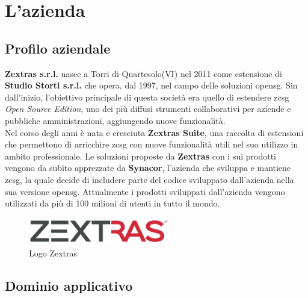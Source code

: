 
\chapter{L'azienda}
\label{cap:azienda}

\section{Profilo aziendale}
    \textbf{Zextras s.r.l.} nasce a Torri di Quartesolo(VI) nel 2011 come estensione di \textbf{Studio Storti s.r.l.} che opera, dal 1997, nel campo delle soluzioni \gls{opensg}. Sin dall'inizio, l'obiettivo principale di questa società era quello di estendere \gls{zcsg} \textit{Open Source Edition}, uno dei più diffusi strumenti collaborativi per aziende e pubbliche amministrazioni, aggiungendo nuove funzionalità. \\
    Nel corso degli anni è nata e cresciuta \textbf{Zextras Suite}, una raccolta di estensioni che permettono di arricchire \gls{zcsg} con nuove funzionalità utili nel suo utilizzo in ambito professionale.
    Le soluzioni proposte da \textbf{Zextras} con i sui prodotti vengono da subito apprezzate da \textbf{Synacor}, l'azienda che sviluppa e mantiene \gls{zcsg}, la quale decide di includere parte del codice sviluppato dall'azienda nella sua versione \gls{opensg}. Attualmente i prodotti sviluppati dall'azienda vengono utilizzati da più di 100 milioni di utenti in tutto il mondo.

    \begin{figure}[h]
        \centering
        \includegraphics[width=0.55\textwidth]{immagini/zextras_logo.png}
        \caption{Logo Zextras}
        \label{fig: Logo Zextras}
    \end{figure}

\section{Dominio applicativo}
